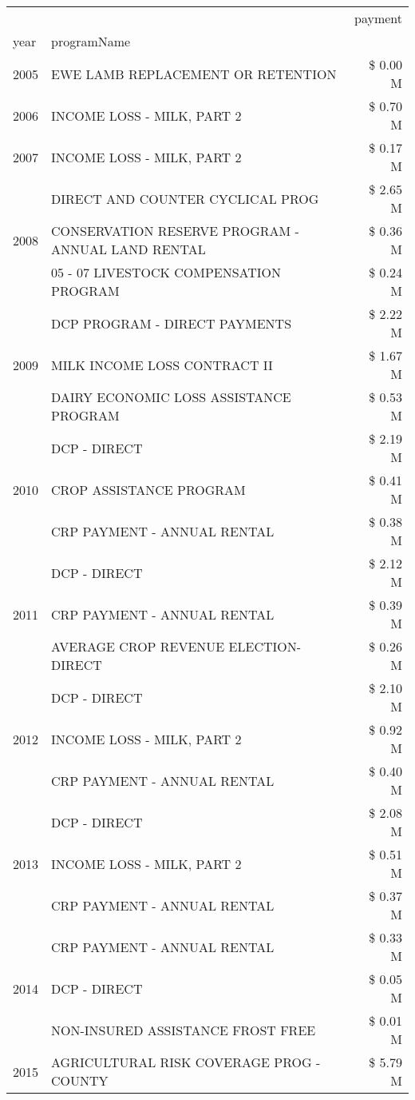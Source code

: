 \begin{tabular}{llr}
\toprule
 &  & payment \\
year & programName &  \\
\midrule
2005 & EWE LAMB REPLACEMENT OR RETENTION & \$ 0.00 M \\
\cline{1-3}
2006 & INCOME LOSS - MILK, PART 2 & \$ 0.70 M \\
\cline{1-3}
2007 & INCOME LOSS - MILK, PART 2 & \$ 0.17 M \\
\cline{1-3}
\multirow[t]{3}{*}{2008} & DIRECT AND COUNTER CYCLICAL PROG & \$ 2.65 M \\
 & CONSERVATION RESERVE PROGRAM - ANNUAL LAND RENTAL & \$ 0.36 M \\
 & 05 - 07 LIVESTOCK COMPENSATION PROGRAM & \$ 0.24 M \\
\cline{1-3}
\multirow[t]{3}{*}{2009} & DCP PROGRAM - DIRECT PAYMENTS & \$ 2.22 M \\
 & MILK INCOME LOSS CONTRACT II & \$ 1.67 M \\
 & DAIRY ECONOMIC LOSS ASSISTANCE PROGRAM & \$ 0.53 M \\
\cline{1-3}
\multirow[t]{3}{*}{2010} & DCP - DIRECT & \$ 2.19 M \\
 & CROP ASSISTANCE PROGRAM & \$ 0.41 M \\
 & CRP PAYMENT - ANNUAL RENTAL & \$ 0.38 M \\
\cline{1-3}
\multirow[t]{3}{*}{2011} & DCP - DIRECT & \$ 2.12 M \\
 & CRP PAYMENT - ANNUAL RENTAL & \$ 0.39 M \\
 & AVERAGE CROP REVENUE ELECTION-DIRECT & \$ 0.26 M \\
\cline{1-3}
\multirow[t]{3}{*}{2012} & DCP - DIRECT & \$ 2.10 M \\
 & INCOME LOSS - MILK, PART 2 & \$ 0.92 M \\
 & CRP PAYMENT - ANNUAL RENTAL & \$ 0.40 M \\
\cline{1-3}
\multirow[t]{3}{*}{2013} & DCP - DIRECT & \$ 2.08 M \\
 & INCOME LOSS - MILK, PART 2 & \$ 0.51 M \\
 & CRP PAYMENT - ANNUAL RENTAL & \$ 0.37 M \\
\cline{1-3}
\multirow[t]{3}{*}{2014} & CRP PAYMENT - ANNUAL RENTAL & \$ 0.33 M \\
 & DCP - DIRECT & \$ 0.05 M \\
 & NON-INSURED ASSISTANCE FROST FREE & \$ 0.01 M \\
\cline{1-3}
\multirow[t]{3}{*}{2015} & AGRICULTURAL RISK COVERAGE PROG - COUNTY & \$ 5.79 M \\

\end{tabular}

